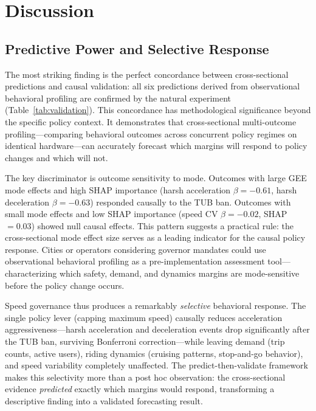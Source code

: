 \section{Discussion}
\label{sec:discussion}

\subsection{Predictive Power and Selective Response}
\label{sec:disc_predictive}

The most striking finding is the perfect concordance between cross-sectional predictions and causal validation: all six predictions derived from observational behavioral profiling are confirmed by the natural experiment (Table~\ref{tab:validation}). This concordance has methodological significance beyond the specific policy context. It demonstrates that cross-sectional multi-outcome profiling---comparing behavioral outcomes across concurrent policy regimes on identical hardware---can accurately forecast which margins will respond to policy changes and which will not.

The key discriminator is outcome sensitivity to mode. Outcomes with large GEE mode effects and high SHAP importance (harsh acceleration $\beta = -0.61$, harsh deceleration $\beta = -0.63$) responded causally to the TUB ban. Outcomes with small mode effects and low SHAP importance (speed CV $\beta = -0.02$, SHAP $= 0.03$) showed null causal effects. This pattern suggests a practical rule: the cross-sectional mode effect size serves as a leading indicator for the causal policy response. Cities or operators considering governor mandates could use observational behavioral profiling as a pre-implementation assessment tool---characterizing which safety, demand, and dynamics margins are mode-sensitive before the policy change occurs.

Speed governance thus produces a remarkably \textit{selective} behavioral response. The single policy lever (capping maximum speed) causally reduces acceleration aggressiveness---harsh acceleration and deceleration events drop significantly after the TUB ban, surviving Bonferroni correction---while leaving demand (trip counts, active users), riding dynamics (cruising patterns, stop-and-go behavior), and speed variability completely unaffected. The predict-then-validate framework makes this selectivity more than a post hoc observation: the cross-sectional evidence \textit{predicted} exactly which margins would respond, transforming a descriptive finding into a validated forecasting result.

